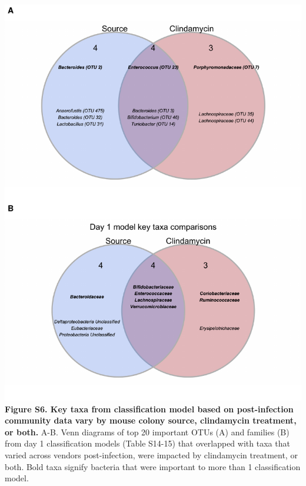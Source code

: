 \documentclass[11pt,]{article}
\begin{document}
\includegraphics{figure_S6.pdf} \textbf{Figure S6. Key taxa from
classification model based on post-infection community data vary by
mouse colony source, clindamycin treatment, or both.} A-B. Venn diagrams
of top 20 important OTUs (A) and families (B) from day 1 classification
models (Table S14-15) that overlapped with taxa that varied across
vendors post-infection, were impacted by clindamycin treatment, or both.
Bold taxa signify bacteria that were important to more than 1
classification model.

\newpage
\end{document}
